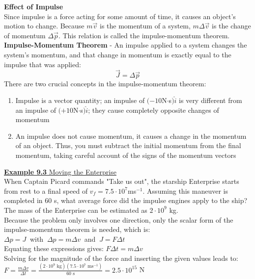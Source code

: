 \documentclass[a4paper]{article}
\let\bf\textbf
\begin{document}
\noindent\bf{Effect of Impulse}
\vspace{2mm}\\
Since impulse is a force acting for some amount of time, it causes an object's motion to change. Because $m\vec{v}$ is the momentum of a system, $m\Delta\vec{v}$ is the change of momentum $\Delta\vec{p}$. This relation is called the impulse-momentum theorem.
\vspace{1mm}\\
\bf{Impulse-Momentum Theorem} - An impulse applied to a system changes the system's momentum, and that change in momentum is exactly equal to the impulse that was applied:
\begin{equation}
    \vec{J} = \Delta\vec{p}
\end{equation}
There are two crucial concepts in the impulse-momentum theorem:
\begin{enumerate}
    \item Impulse is a vector quantity; an impulse of $(-10$N$\cdot$s$)\hat{i}$ is very different from an impulse of $(+10$N$\cdot$s$)\hat{i}$; they cause completely opposite changes of momentum
    \item An impulse does not cause momentum, it causes a change in the momentum of an object. Thus, you must subtract the initial momentum from the final momentum, taking careful account of the signs of the momentum vectors
\end{enumerate}
\begin{shaded}
    \underline{\bf{Example 9.3} Moving the Enterprise}
    \vspace{2mm}\\
    When Captain Picard commands "Take us out", the starship Enterprise starts from rest to a final speed of $v_f = 7.5 \cdot 10^7$ms$^{-1}$. Assuming this maneuver is completed in 60 s, what average force did the impulse engines apply to the ship? The mass of the Enterprise can be estimated as $2 \cdot 10^9$ kg.
    \vspace{1mm}\\
    Because the problem only involves one direction, only the scalar form of the impulse-momentum theorem is needed, which is:\\
    $\Delta p = J\ $ with $\ \Delta p = m \Delta v\ $ and $\ J = F \Delta t$\\
    Equating these expressions gives: $F \Delta t = m \Delta v$\\
    Solving for the magnitude of the force and inserting the given values leads to:\\
    $\displaystyle F = \frac{m \Delta v}{\Delta t} = \frac{(2 \cdot 10^9\text{ kg})(7.5 \cdot 10^7 \text{ ms}^{-1})}{60\text{ s}} = 2.5 \cdot 10^{15}$ N
\end{shaded}
\end{document}
